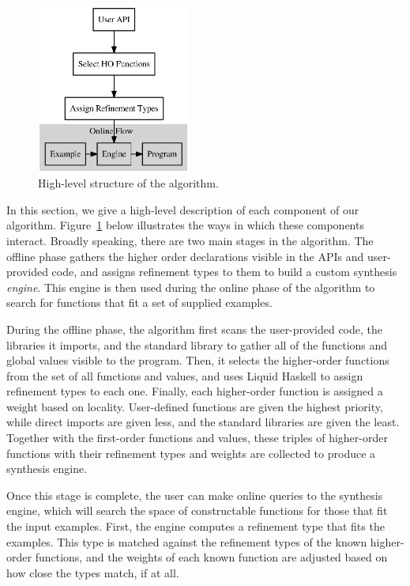 \begin{figure}[t]
  \centering
  \includegraphics[width=0.45\textwidth]{algo}
  \caption{High-level structure of the algorithm.}
  \label{fig:high_level_overview}
\end{figure}

In this section, we give a high-level description of each component of our algorithm. Figure~\ref{fig:high_level_overview} below illustrates the ways in which these components interact. Broadly speaking, there are two main stages in the algorithm. The offline phase gathers the higher order declarations visible in the APIs and user-provided code, and assigns refinement types to them to build a custom synthesis \textit{engine}. This engine is then used during the online phase of the algorithm to search for functions that fit a set of supplied examples.

During the offline phase, the algorithm first scans the user-provided code, the libraries it imports, and the standard library to gather all of the functions and global values visible to the program. Then, it selects the higher-order functions from the set of all functions and values, and uses Liquid Haskell \cite{liquidhaskell} to assign refinement types to each one. Finally, each higher-order function is assigned a weight based on locality. User-defined functions are given the highest priority, while direct imports are given less, and the standard libraries are given the least. Together with the first-order functions and values, these triples of higher-order functions with their refinement types and weights are collected to produce a synthesis engine.

Once this stage is complete, the user can make online queries to the synthesis engine, which will search the space of constructable functions for those that fit the input examples. First, the engine computes a refinement type that fits the examples. This type is matched against the refinement types of the known higher-order functions, and the weights of each known function are adjusted based on how close the types match, if at all.


